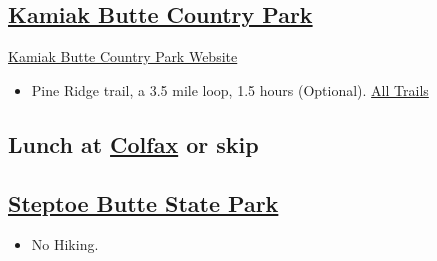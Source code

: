 \documentclass{article}
\newcommand{\KamiakButteCountryPark}{\href{https://maps.app.goo.gl/1tkTZRiLE7eipXeE9}{Kamiak Butte Country Park}}
\newcommand{\SteptoeButteStatePark}{\href{https://maps.app.goo.gl/6vj1gx25XB5dEsUW8}{Steptoe Butte State Park}}
\begin{document}
\subsection{\KamiakButteCountryPark}
\href{https://www.whitmancounty.org/facilities/facility/details/Kamiak-Butte-County-Park-1}{Kamiak Butte Country Park Website}

\begin{itemize}
  \item{Pine Ridge trail, a 3.5 mile loop, 1.5 hours (Optional). \href{https://www.alltrails.com/trail/us/washington/kamiak-butte-trail}{All Trails}}
\end{itemize}


\subsection{Lunch at \href{https://maps.app.goo.gl/bh54WPhsrkuKu8Ae8}{Colfax} or skip}

\subsection{\SteptoeButteStatePark}
\begin{itemize}
  \item{No Hiking.}
\end{itemize}

\end{document}
